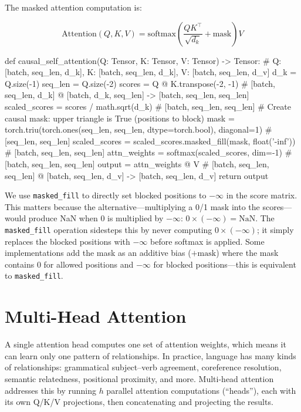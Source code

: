 The masked attention computation is:

\[
  \text{Attention}(Q, K, V) = \text{softmax}\!\left(\frac{QK^\top}{\sqrt{d_k}} + \text{mask}\right)V
\]

\begin{pseudocode}
def causal_self_attention(Q: Tensor, K: Tensor, V: Tensor) -> Tensor:
    # Q: [batch, seq_len, d_k], K: [batch, seq_len, d_k], V: [batch, seq_len, d_v]
    d_k = Q.size(-1)
    seq_len = Q.size(-2)
    scores = Q @ K.transpose(-2, -1)  # [batch, seq_len, d_k] @ [batch, d_k, seq_len] -> [batch, seq_len, seq_len]
    scaled_scores = scores / math.sqrt(d_k)  # [batch, seq_len, seq_len]
    # Create causal mask: upper triangle is True (positions to block)
    mask = torch.triu(torch.ones(seq_len, seq_len, dtype=torch.bool), diagonal=1)  # [seq_len, seq_len]
    scaled_scores = scaled_scores.masked_fill(mask, float('-inf'))  # [batch, seq_len, seq_len]
    attn_weights = softmax(scaled_scores, dim=-1)  # [batch, seq_len, seq_len]
    output = attn_weights @ V  # [batch, seq_len, seq_len] @ [batch, seq_len, d_v] -> [batch, seq_len, d_v]
    return output
\end{pseudocode}

\begin{keyconcept}
  We use \texttt{masked\_fill} to directly set blocked positions to
  $-\infty$ in the score matrix. This matters because the alternative---multiplying
  a 0/1 mask into the scores---would produce NaN when 0 is multiplied by
  $-\infty$: $0 \times (-\infty) = \text{NaN}$. The \texttt{masked\_fill}
  operation sidesteps this by never computing $0 \times (-\infty)$; it simply
  replaces the blocked positions with $-\infty$ before softmax is applied.
  Some implementations add the mask as an additive bias ($+\text{mask}$)
  where the mask contains $0$ for allowed positions and $-\infty$ for blocked
  positions---this is equivalent to \texttt{masked\_fill}.
\end{keyconcept}

\section{Multi-Head Attention}

A single attention head computes one set of attention weights, which means it
can learn only one pattern of relationships. In practice, language has many
kinds of relationships: grammatical subject--verb agreement, coreference
resolution, semantic relatedness, positional proximity, and more. Multi-head
attention addresses this by running $h$ parallel attention computations (``heads''),
each with its own Q/K/V projections, then concatenating and projecting the
results.

